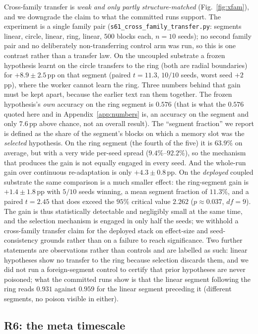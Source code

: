 \documentclass[preprint,12pt]{elsarticle}
\begin{document}
Cross-family transfer is \emph{weak and only partly structure-matched}
(Fig.~\ref{fig:xfam}), and we downgrade the claim to what the committed runs
support. The experiment is a single family pair
(\texttt{s61\_cross\_family\_transfer.py}: segments linear, circle, linear,
ring, linear, $500$ blocks each, $n=10$ seeds); no second family pair and no
deliberately non-transferring control arm was run, so this is one contrast
rather than a transfer law. On the uncoupled substrate a frozen hypothesis
learnt on the circle transfers to the ring (both are radial boundaries)
for $+8.9\pm2.5$\,pp on that segment (paired $t=11.3$, $10/10$ seeds, worst
seed $+2$\,pp), where the worker cannot learn the ring. Three numbers behind
that gain must be kept apart, because the earlier text ran them together. The
frozen hypothesis's \emph{own} accuracy on the ring segment is $0.576$
(that is what the $0.576$ quoted here and in Appendix~\ref{app:numbers} is, an
accuracy on the segment and only $7.6$\,pp above chance, not an overall
result). The ``segment fraction'' we report is defined as the share of the
segment's blocks on which a memory slot was the \emph{selected} hypothesis. On
the ring segment (the fourth of the five) it is $63.9\%$ on average, but with a very wide per-seed spread
($9.4\%$--$92.2\%$), so the mechanism that produces the gain is not equally
engaged in every seed. And the whole-run gain over continuous re-adaptation is
only $+4.3\pm0.8$\,pp. On the \emph{deployed} coupled substrate the same
comparison is a much smaller effect: the ring-segment gain is
$+1.4\pm1.8$\,pp with $5/10$ seeds winning, a mean segment fraction of
$11.3\%$, and a paired $t=2.45$ that does exceed the $95\%$ critical value
$2.262$ ($p\approx0.037$, $df=9$). The gain is thus statistically detectable
and negligibly small at the same time, and the selection mechanism is engaged
in only half the seeds; we withhold a cross-family transfer claim for the
deployed stack on effect-size and seed-consistency grounds rather than on a
failure to reach significance. Two further statements are observations
rather than controls and are labelled as such: linear hypotheses show no
transfer to the ring because selection discards them, and we did not run a
foreign-segment control to certify that prior hypotheses are never poisoned; what the committed runs show is that the linear segment following the ring
reads $0.931$ against $0.959$ for the linear segment preceding it (different
segments, no poison visible in either).

\subsection{R6: the meta timescale}
\label{sec:r6}
\end{document}

